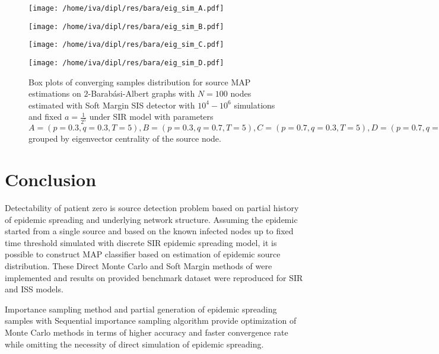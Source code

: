 \documentclass[times, utf8, diplomski]{fer}
\begin{document}
\begin{figure}[H]
\begin{minipage}{\textwidth}
\begin{minipage}{0.5\textwidth}
\texttt{[image: /home/iva/dipl/res/bara/eig\_sim\_A.pdf]}
\end{minipage}
\begin{minipage}{0.5\textwidth}
\texttt{[image: /home/iva/dipl/res/bara/eig\_sim\_B.pdf]}
\end{minipage}
\begin{minipage}{0.5\textwidth}
\texttt{[image: /home/iva/dipl/res/bara/eig\_sim\_C.pdf]}
\end{minipage}
\begin{minipage}{0.5\textwidth}
\texttt{[image: /home/iva/dipl/res/bara/eig\_sim\_D.pdf]}
\end{minipage}
\caption{Box plots of converging samples distribution for source MAP estimations on  $2$-Barab\'{a}si-Albert graphs  with $N=100$ nodes estimated with Soft Margin SIS detector with $10^4 - 10^6$ simulations and fixed $a = \frac{1}{2^5}$ under SIR model with parameters $A = (p=0.3, q=0.3, T=5), B = (p=0.3, q=0.7, T=5), C = (p=0.7, q=0.3, T=5), D = (p=0.7, q=0.7, T=5)$ grouped by eigenvector centrality of the source node.}
\label{eig_sim}
\end{minipage}
\end{figure}

\chapter{Conclusion}

Detectability of patient zero is source detection problem based on partial history of epidemic spreading and underlying network structure.
Assuming the epidemic started from a single source and based on the known infected nodes up to fixed time threshold simulated with discrete SIR epidemic spreading model, it is possible to construct MAP classifier based on estimation of epidemic source distribution. These Direct Monte Carlo and Soft Margin methods  of \citet{Nino} were implemented  and results on provided benchmark dataset were reproduced for SIR and ISS models. 

Importance sampling method and partial generation of epidemic spreading samples with Sequential importance sampling algorithm provide optimization  of Monte Carlo methods in terms of higher accuracy and faster convergence rate while omitting the necessity of direct simulation of  epidemic spreading.
\end{document}
